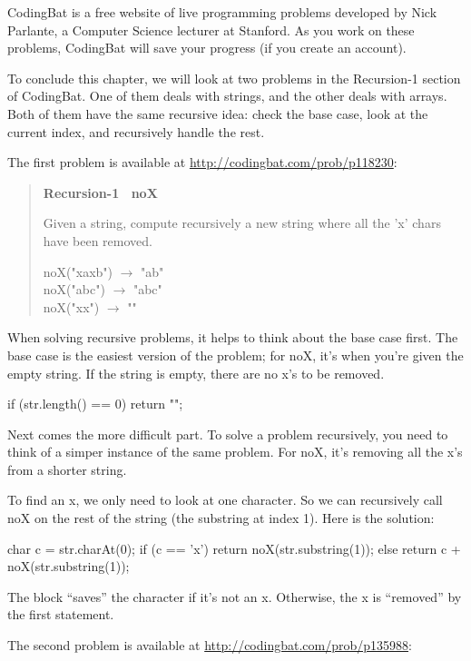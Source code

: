 CodingBat is a free website of live programming problems developed by Nick Parlante, a Computer Science lecturer at Stanford.
As you work on these problems, CodingBat will save your progress (if you create an account).

To conclude this chapter, we will look at two problems in the {\sf Recursion-1} section of CodingBat.
One of them deals with strings, and the other deals with arrays.
Both of them have the same recursive idea: check the base case, look at the current index, and recursively handle the rest.

The first problem is available at \url{http://codingbat.com/prob/p118230}:

\begin{quote}
\textbf{Recursion-1 ~noX}

Given a string, compute recursively a new string where all the 'x' chars have been removed.

\ttfamily
noX("xaxb") $\rightarrow$ "ab" \\
noX("abc") $\rightarrow$ "abc" \\
noX("xx") $\rightarrow$ ""
\end{quote}

When solving recursive problems, it helps to think about the base case first.
The base case is the easiest version of the problem; for noX, it's when you're given the empty string.
If the string is empty, there are no x's to be removed.

\begin{code}
if (str.length() == 0) {
    return "";
}
\end{code}

Next comes the more difficult part.
To solve a problem recursively, you need to think of a simper instance of the same problem.
For noX, it's removing all the x's from a shorter string.

To find an x, we only need to look at one character.
So we can recursively call noX on the rest of the string (the substring at index 1).
Here is the solution:

\begin{code}
char c = str.charAt(0);
if (c == 'x') {
    return noX(str.substring(1));
} else {
    return c + noX(str.substring(1));
}
\end{code}

The  block ``saves'' the character if it's not an x.
Otherwise, the x is ``removed'' by the first  statement.

The second problem is available at \url{http://codingbat.com/prob/p135988}:

